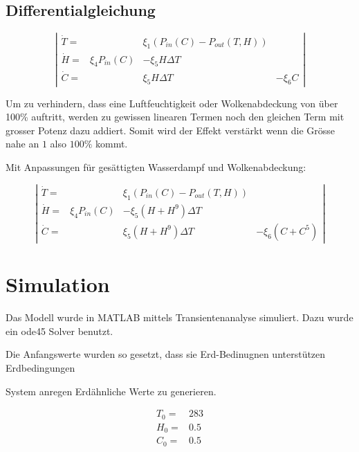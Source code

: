 \begin{refsection}
\subsection{Differentialgleichung}

\begin{equation}
\left|
\begin{matrix}
\dot{T} = &  & \xi_1 \left(P_{in}(C) - P_{out}(T, H) \right) &\\
\dot{H} = & \xi_4 P_{in}(C) & - \xi_5 H \Delta T & \\
\dot{C} = &                 &   \xi_5 H \Delta T & - \xi_6 C
\end{matrix}
\right|
\end{equation}

Um zu verhindern, dass eine Luftfeuchtigkeit oder Wolkenabdeckung von über 100\% auftritt, werden zu gewissen linearen Termen noch den gleichen Term mit grosser Potenz dazu addiert. Somit wird der Effekt verstärkt wenn die Grösse nahe an $1$ also $100\%$ kommt.  

Mit Anpassungen für gesättigten Wasserdampf und Wolkenabdeckung:

\begin{equation}
\left|
\begin{matrix}
\dot{T} = & & \xi_1 \left(P_{in}(C) - P_{out}(T, H) \right) &\\
\dot{H} = & \xi_4 P_{in}(C) & - \xi_5 (H + H^9) \Delta T & \\
\dot{C} = &                 &   \xi_5 (H + H^9) \Delta T & - \xi_6 (C + C^5)
\end{matrix}
\right|
\end{equation}


\section{Simulation}

Das Modell wurde in MATLAB mittels Transientenanalyse simuliert. Dazu wurde ein ode45 Solver benutzt.




Die Anfangswerte wurden so gesetzt, dass sie Erd-Bedinugnen unterstützen  
	Erdbedingungen
	
	System anregen Erdähnliche Werte zu generieren.

\begin{equation}
\begin{matrix}
T_0 = & 283 \\
H_0 = & 0.5 \\
C_0 = & 0.5
\end{matrix}
\end{equation}


\end{refsection}

